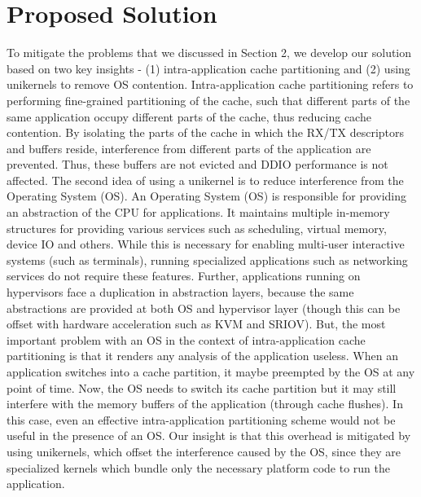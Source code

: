 \documentclass[sigconf,authorversion,noacm]{acmart}
\begin{document}
\section{Proposed Solution}

To mitigate the problems that we discussed in Section 2, we develop our solution
based on two key insights - (1) intra-application cache partitioning and (2)
using unikernels to remove OS contention. Intra-application cache partitioning
refers to performing fine-grained partitioning of the cache, such that different
parts of the same application occupy different parts of the cache, thus reducing
cache contention. By isolating the parts of the cache in which the RX/TX
descriptors and buffers reside, interference from different parts of the
application are prevented. Thus, these buffers are not evicted and DDIO
performance is not affected. The second idea of using a unikernel is to reduce
interference from the Operating System (OS). An Operating System (OS) is
responsible for providing an abstraction of the CPU for applications. It
maintains multiple in-memory structures for providing various services such as
scheduling, virtual memory, device IO and others. While this is necessary for
enabling multi-user interactive systems (such as terminals), running specialized
applications such as networking services do not require these features. Further,
applications running on hypervisors face a duplication in abstraction layers,
because the same abstractions are provided at both OS and hypervisor layer
(though this can be offset with hardware acceleration such as KVM and SRIOV).
But, the most important problem with an OS in the context of intra-application
cache partitioning is that it renders any analysis of the application useless.
When an application switches into a cache partition, it maybe preempted by the
OS at any point of time. Now, the OS needs to switch its cache partition but it
may still interfere with the memory buffers of the application (through cache
flushes). In this case, even an effective intra-application partitioning scheme
would not be useful in the presence of an OS. Our insight is that this overhead
is mitigated by using unikernels, which offset the interference caused by the
OS, since they are specialized kernels which bundle only the necessary platform
code to run the application.
\end{document}
